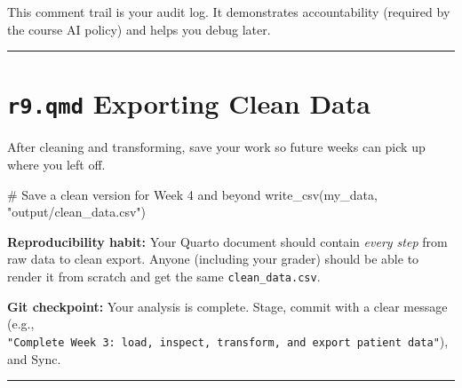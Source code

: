 \documentclass[
  letterpaper,
  DIV=11,
  numbers=noendperiod,
  oneside]{scrreprt}
\newenvironment{Shaded}{\begin{snugshade}}{\end{snugshade}}
\newcommand{\CommentTok}[1]{\textcolor[rgb]{0.37,0.37,0.37}{#1}}
\newcommand{\FunctionTok}[1]{\textcolor[rgb]{0.28,0.35,0.67}{#1}}
\newcommand{\NormalTok}[1]{\textcolor[rgb]{0.00,0.23,0.31}{#1}}
\newcommand{\StringTok}[1]{\textcolor[rgb]{0.13,0.47,0.30}{#1}}
\begin{document}
This comment trail is your audit log. It demonstrates accountability
(required by the course AI policy) and helps you debug later.

\begin{center}\rule{0.5\linewidth}{0.5pt}\end{center}

\section*{\texorpdfstring{\texttt{r9.qmd} Exporting Clean
Data}{r9.qmd Exporting Clean Data}}\label{r9.qmd-exporting-clean-data}


After cleaning and transforming, save your work so future weeks can pick
up where you left off.

\begin{Shaded}
\begin{Highlighting}[numbers=left,,]
\CommentTok{\# Save a clean version for Week 4 and beyond}
\FunctionTok{write\_csv}\NormalTok{(my\_data, }\StringTok{"output/clean\_data.csv"}\NormalTok{)}
\end{Highlighting}
\end{Shaded}

\begin{tcolorbox}[enhanced jigsaw, opacitybacktitle=0.6, colbacktitle=quarto-callout-tip-color!10!white, breakable, opacityback=0, coltitle=black, toptitle=1mm, bottomrule=.15mm, colframe=quarto-callout-tip-color-frame, bottomtitle=1mm, colback=white, leftrule=.75mm, rightrule=.15mm, title=\textcolor{quarto-callout-tip-color}{\faLightbulb}\hspace{0.5em}{Tip}, left=2mm, arc=.35mm, toprule=.15mm, titlerule=0mm]

\textbf{Reproducibility habit:} Your Quarto document should contain
\emph{every step} from raw data to clean export. Anyone (including your
grader) should be able to render it from scratch and get the same
\texttt{clean\_data.csv}.

\end{tcolorbox}

\textbf{Git checkpoint:} Your analysis is complete. Stage, commit with a
clear message (e.g.,
\texttt{"Complete\ Week\ 3:\ load,\ inspect,\ transform,\ and\ export\ patient\ data"}),
and Sync.

\begin{center}\rule{0.5\linewidth}{0.5pt}\end{center}
\end{document}

